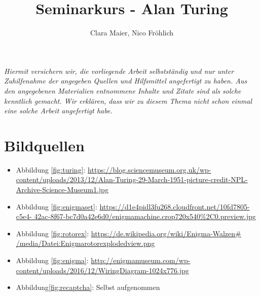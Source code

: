 \documentclass[11pt,a4paper]{article}
\author{Clara Maier, Nico Fröhlich}
\title{Seminarkurs - Alan Turing}
\renewcommand{\figurename}{Abbildung}
\newcommand{\picturesource}[2]{\item {\figurename} \ref{#1}: \href{#2}{#2}}
\begin{document}
\maketitle
\newpage
\emph{Hiermit versichern wir, die vorliegende Arbeit selbstständig und nur unter Zuhilfenahme der angegeben Quellen und Hilfsmittel angefertigt zu haben. Aus den angegebenen Materialien entnommene Inhalte und Zitate sind als solche kenntlich gemacht. Wir erklären, dass wir zu diesem Thema nicht schon einmal eine solche Arbeit angefertigt habe.}
\newpage

\tableofcontents
\newpage








\section*{Bildquellen}
{\renewcommand\labelitemi{}
\begin{itemize}
\picturesource{fig:turing}{https://blog.sciencemuseum.org.uk/wp-content/uploads/2013/12/Alan-Turing-29-March-1951-picture-credit-NPL-Archive-Science-Museum1.jpg}
\picturesource{fig:enigmaset}{https://d1e4pidl3fu268.cloudfront.net/10fd7805-c5e4-
42ac-8f67-bc7d0a42e6d0/enigma\textunderscore machine.crop\textunderscore 720x540\textunderscore 68\%2C0.preview.jpg}
\picturesource{fig:rotorex}{https://de.wikipedia.org/wiki/Enigma-Walzen\# /media/Datei:Enigma\textunderscore rotor\textunderscore exploded\textunderscore view.png}
\picturesource{fig:enigma}{http://enigmamuseum.com/wp-content/uploads/2016/12/WiringDiagram-1024x776.jpg}
\item \figurename \ref{fig:recaptcha}: Selbst aufgenommen
\end{itemize}
}



\end{document}
